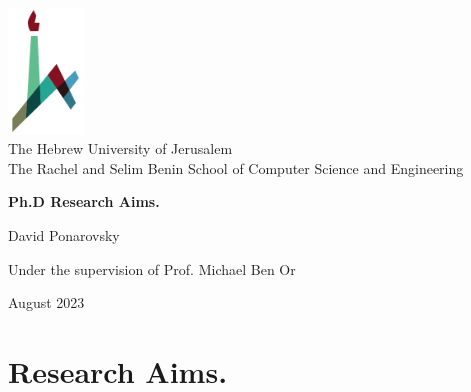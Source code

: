 \documentclass[11pt, oneside]{book}
\begin{document}

\begin{titlepage}
    \begin{center}
        \vspace*{1cm}
        
        \includegraphics[width=0.15\textwidth]{huji_logo_notext.pdf}\\
        { \large The Hebrew University of Jerusalem\\
        The Rachel and Selim Benin School of Computer Science and Engineering }
        
        \vspace{2cm}
        
        {\huge \textbf{Ph.D Research Aims.}}
        
        \vspace{1cm}
        
        \vspace{1.5cm}
        
        { \large David Ponarovsky }
        
        \vspace{1cm}
        
        { \large  Under the supervision of Prof. Michael Ben Or }

        
        \vfill
        
        {\large August 2023 }
    \end{center}
\end{titlepage}

\setlength{\parindent}{0pt}
\setlength{\parskip}{5pt}

\chapter{Research Aims.}
\end{document}
